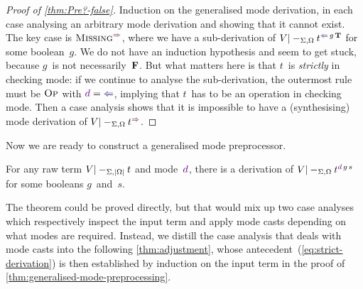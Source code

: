 \begin{proof}[Proof of \cref{thm:Pre?-false}]
Induction on the generalised mode derivation, in each case analysing an arbitrary mode derivation and showing that it cannot exist.
The key case is $\SynRule{Missing}$, where we have a sub-derivation of $V |-_{\Sigma,\Omega} t^{\chk\,g\,\BTrue}$ for some boolean~$g$.
We do not have an induction hypothesis and seem to get stuck, because $g$~is not necessarily~$\mathbf{F}$.
But what matters here is that $t$~is \emph{strictly} in checking mode: if we continue to analyse the sub-derivation, the outermost rule must be $\textnormal{\textsc{Op}}$ with $\dir d = {\chk}$, implying that $t$~has to be an operation in checking mode.
Then a case analysis shows that it is impossible to have a (synthesising) mode derivation of $V |-_{\Sigma,\Omega} t^{\syn}$.
\end{proof}

Now we are ready to construct a generalised mode preprocessor.

\begin{theorem}\label{thm:generalised-mode-preprocessing}
For any raw term $V |-_{\Sigma,\left|\Omega\right|} t$ and mode~$\dir{d}$, there is a derivation of\/ $V |-_{\Sigma,\Omega} t^{\dir{d}\,g\,s}$ for some booleans $g$~and~$s$.
\end{theorem}

The theorem could be proved directly, but that would mix up two case analyses which respectively inspect the input term and apply mode casts depending on what modes are required.
Instead, we distill the case analysis that deals with mode casts into the following \cref{thm:adjustment}, whose antecedent~(\ref{eq:strict-derivation}) is then established by induction on the input term in the proof of \cref{thm:generalised-mode-preprocessing}.

